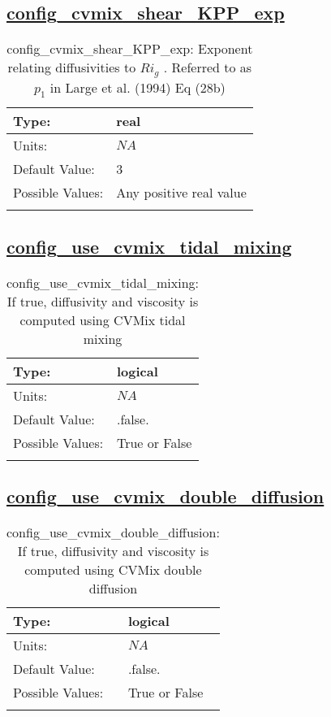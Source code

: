 \subsection[config\_cvmix\_shear\_KPP\_exp]{\hyperref[sec:nm_tab_cvmix]{config\_cvmix\_shear\_KPP\_exp}}
\label{subsec:nm_sec_config_cvmix_shear_KPP_exp}
\begin{center}
\begin{longtable}{| p{2.0in} || p{4.0in} |}
    \hline
    Type: & real \\
    \hline
    Units: & $NA$ \\
    \hline
    Default Value: & 3 \\
    \hline
    Possible Values: & Any positive real value \\
    \hline
    \caption{config\_cvmix\_shear\_KPP\_exp:  Exponent relating diffusivities to  $Ri_g$ . Referred to as  $p_1$  in Large et al. (1994) Eq (28b)}
\end{longtable}
\end{center}
\subsection[config\_use\_cvmix\_tidal\_mixing]{\hyperref[sec:nm_tab_cvmix]{config\_use\_cvmix\_tidal\_mixing}}
\label{subsec:nm_sec_config_use_cvmix_tidal_mixing}
\begin{center}
\begin{longtable}{| p{2.0in} || p{4.0in} |}
    \hline
    Type: & logical \\
    \hline
    Units: & $NA$ \\
    \hline
    Default Value: & .false. \\
    \hline
    Possible Values: & True or False \\
    \hline
    \caption{config\_use\_cvmix\_tidal\_mixing: If true, diffusivity and viscosity is computed using CVMix tidal mixing}
\end{longtable}
\end{center}
\subsection[config\_use\_cvmix\_double\_diffusion]{\hyperref[sec:nm_tab_cvmix]{config\_use\_cvmix\_double\_diffusion}}
\label{subsec:nm_sec_config_use_cvmix_double_diffusion}
\begin{center}
\begin{longtable}{| p{2.0in} || p{4.0in} |}
    \hline
    Type: & logical \\
    \hline
    Units: & $NA$ \\
    \hline
    Default Value: & .false. \\
    \hline
    Possible Values: & True or False \\
    \hline
    \caption{config\_use\_cvmix\_double\_diffusion: If true, diffusivity and viscosity is computed using CVMix double diffusion}
\end{longtable}
\end{center}
